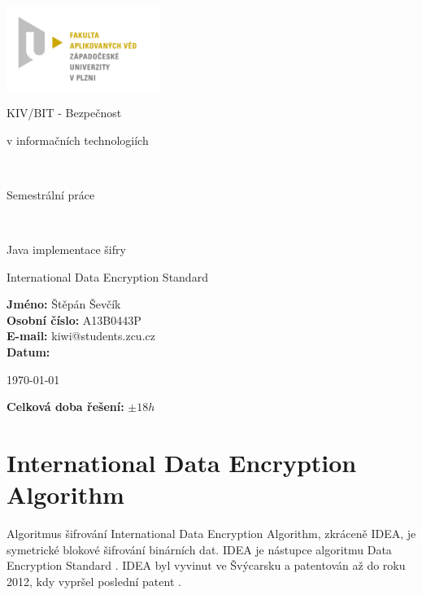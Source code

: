 \documentclass[12pt,a4paper]{article}
\author{Jan Šmejkal}
\let\oldsection\section
\renewcommand\section{\clearpage\oldsection}
\begin{document}
\begin{titlepage}

\includegraphics[width=50mm]{img/FAV.jpg}
\\[160 pt]
\centerline{ \Huge \sc KIV/BIT - Bezpečnost}
\centerline{ \Huge \sc v informačních technologiích}
\\[6 pt]
\centerline{ \LARGE \sc Semestrální práce}
\\[12 pt]
\centerline{ \large \sc Java implementace šifry}
\centerline{ \large \sc International Data Encryption Standard}


{
\vfill 
\parindent=0cm
\textbf{Jméno:} Štěpán Ševčík\\
\textbf{Osobní číslo:} A13B0443P\\
\textbf{E-mail:} kiwi@students.zcu.cz\\
\textbf{Datum:} {\large \today\par} %
\textbf{Celková doba řešení:} {\large $\pm 18h$} %

}

\end{titlepage}


\newpage
\setcounter{page}{2}
\setcounter{tocdepth}{3}
\tableofcontents



\section{International Data Encryption Algorithm}
Algoritmus šifrování International Data Encryption Algorithm, zkráceně IDEA, je symetrické blokové šifrování binárních dat.
IDEA je nástupce algoritmu Data Encryption Standard \cite{wiki.IDEA}. IDEA byl vyvinut ve Švýcarsku a patentován až do roku 2012, kdy vypršel poslední patent \cite{source-code.IDEA}.
\end{document}
